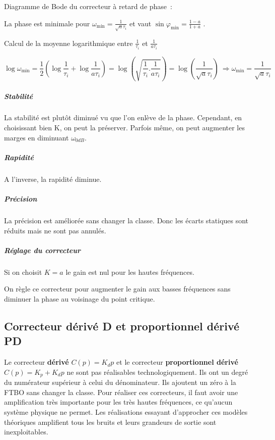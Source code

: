 Diagramme de Bode du correcteur à retard de phase~:

La phase est minimale pour \(\omega_{\min} = \frac{1}{\sqrt{a}\tau_{i}}\) et vaut \(\sin\varphi_{\min} = \frac{1 - a}{1 + a}\) .

Calcul de la moyenne logarithmique entre \(\frac{1}{\tau_{i}}\) et \(\frac{1}{a\tau_{i}}\)

\[\log\omega_{\min} = \frac{1}{2}\left( \log\frac{1}{\tau_{i}} + \log\frac{1}{a\tau_{i}} \right) = \log\left( \sqrt{\frac{1}{\tau_{i}}.\frac{1}{a\tau_{i}}} \right) = \log\left( \frac{1}{\sqrt{a}\tau_{i}} \right)\  \Rightarrow \omega_{\min} = \frac{1}{\sqrt{a}\tau_{i}}\]

\hypertarget{stabilituxe9-3}{%
\subparagraph*{Stabilité}\label{stabilituxe9-3}}

La stabilité est plutôt diminué vu que l'on enlève de la phase. Cependant, en choisissant bien K, on peut la préserver. Parfois même, on peut augmenter les marges en diminuant \(\omega_{0dB}\).

\hypertarget{rapidituxe9-3}{%
\subparagraph*{Rapidité}\label{rapidituxe9-3}}

A l'inverse, la rapidité diminue.

\hypertarget{pruxe9cision-3}{%
\subparagraph*{Précision}\label{pruxe9cision-3}}

La précision est améliorée sans changer la classe. Donc les écarts statiques sont réduits mais ne sont pas annulés.

\hypertarget{ruxe9glage-du-correcteur-1}{%
\subparagraph*{Réglage du correcteur}\label{ruxe9glage-du-correcteur-1}}

Si on choisit \(K = a\) le gain est nul pour les hautes fréquences.

On règle ce correcteur pour augmenter le gain aux basses fréquences sans diminuer la phase au voisinage du point critique.

\hypertarget{correcteur-duxe9rivuxe9-d-et-proportionnel-duxe9rivuxe9-pd}{%
\subsection{Correcteur dérivé D et proportionnel dérivé PD}\label{correcteur-duxe9rivuxe9-d-et-proportionnel-duxe9rivuxe9-pd}}

Le correcteur \textbf{dérivé} \(C(p) = K_{d}p\) et le correcteur \textbf{proportionnel dérivé} \(C(p) = K_{p} + K_{d}p\) ne sont pas réalisables technologiquement. Ils ont un degré du numérateur supérieur à celui du dénominateur. Ils ajoutent un zéro à la FTBO sans changer la classe. Pour réaliser ces correcteurs, il faut avoir une amplification très importante pour les très hautes fréquences, ce qu'aucun système physique ne permet. Les réalisations essayant d'approcher ces modèles théoriques amplifient tous les bruits et leurs grandeurs de sortie sont inexploitables.

